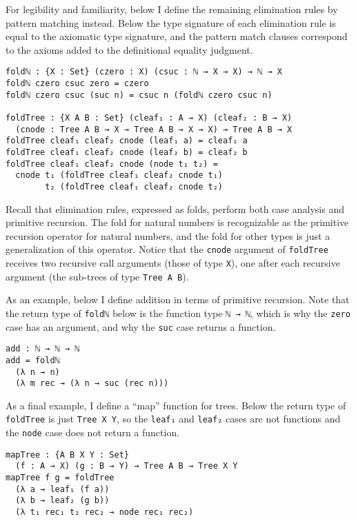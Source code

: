 \documentclass[runningheads,a4paper]{llncs}
\begin{document}
For legibility and familiarity, below I define the remaining
elimination rules by pattern matching instead. Below the type
signature of each elimination rule is equal to the axiomatic type
signature, and the pattern match clauses correspond to the axioms
added to the definitional equality judgment.

\begin{verbatim}
foldℕ : {X : Set} (czero : X) (csuc : ℕ → X → X) → ℕ → X
foldℕ czero csuc zero = czero
foldℕ czero csuc (suc n) = csuc n (foldℕ czero csuc n)

foldTree : {X A B : Set} (cleaf₁ : A → X) (cleaf₂ : B → X)
  (cnode : Tree A B → X → Tree A B → X → X) → Tree A B → X
foldTree cleaf₁ cleaf₂ cnode (leaf₁ a) = cleaf₁ a
foldTree cleaf₁ cleaf₂ cnode (leaf₂ b) = cleaf₂ b
foldTree cleaf₁ cleaf₂ cnode (node t₁ t₂) =
  cnode t₁ (foldTree cleaf₁ cleaf₂ cnode t₁)
        t₂ (foldTree cleaf₁ cleaf₂ cnode t₂)
\end{verbatim}

Recall that elimination rules, expressed as folds, perform both case analysis
and primitive recursion. The fold for natural numbers is recognizable
as the primitive recursion operator for natural numbers, and the fold
for other types is just a generalization of this operator. Notice that
the {\tt cnode} argument of {\tt foldTree} receives two recursive
call arguments (those of type {\tt X}), one after each recursive
argument (the sub-trees of type {\tt Tree A B}).

As an example, below I define addition in terms of primitive recursion.
Note that the return type of {\tt foldℕ} below is the function
type {\tt ℕ → ℕ},
which is why the {\tt zero} case has an argument, and why the
{\tt suc} case returns a function.

\begin{verbatim}
add : ℕ → ℕ → ℕ
add = foldℕ
  (λ n → n)
  (λ m rec → (λ n → suc (rec n)))
\end{verbatim}

As a final example, I define a ``map'' function for trees.
Below the return type of
{\tt foldTree} is just {\tt Tree X Y}, so the
{\tt leaf₁} and {\tt leaf₂} cases are not
functions and the {\tt node} case does not return a function.

\begin{verbatim}
mapTree : {A B X Y : Set}
  (f : A → X) (g : B → Y) → Tree A B → Tree X Y
mapTree f g = foldTree
  (λ a → leaf₁ (f a))
  (λ b → leaf₂ (g b))
  (λ t₁ rec₁ t₂ rec₂ → node rec₁ rec₂)
\end{verbatim}
\end{document}
